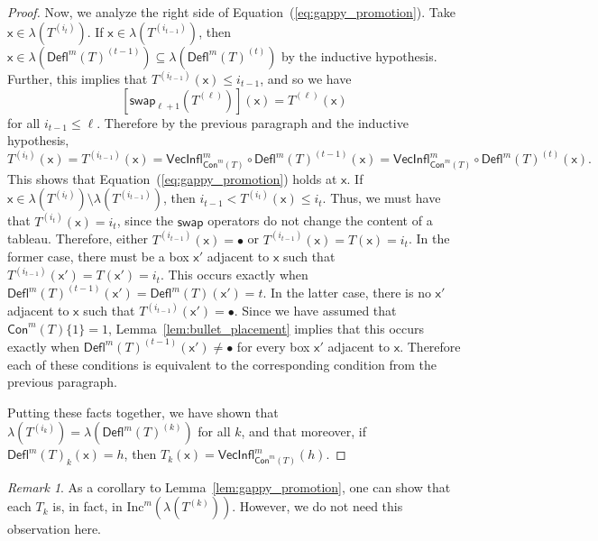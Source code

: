 \documentclass[12pt]{amsart}
\newcommand{\x}{\ensuremath{\mathsf{x}}}
\theoremstyle{definition}
\theoremstyle{remark}
\newtheorem{remark}[theorem]{Remark}
\numberwithin{equation}{section}
\newcommand{\inc}{\ensuremath{\mathrm{Inc}}}
\newcommand{\swap}{\ensuremath{\mathsf{swap}}}
\newcommand{\deflate}{\ensuremath{\mathsf{Defl}}}
\newcommand{\inflate}{\ensuremath{\mathsf{VecInfl}}}
\newcommand{\content}{\ensuremath{\mathsf{Con}}}
\begin{document}
\begin{proof}
Now, we analyze the right side of Equation~(\ref{eq:gappy_promotion}). Take $\x \in \lambda\left( T^{(i_t)} \right)$.   If $\x \in \lambda \left(T^{(i_{t-1})} \right)$, then $\x \in \lambda(\deflate^m(T)^{(t-1)}) \subseteq \lambda(\deflate^m(T)^{(t)})$ by the inductive hypothesis. Further, this implies that $T^{(i_{t-1})}(\x) \leq i_{t-1}$,  and so we have
\[
\left[ \swap_{\ell+1} \left(T^{(\ell)} \right) \right](\x) = T^{(\ell)}(\x)
\]
 for all $i_{t-1} \leq \ell$. Therefore by the previous paragraph and the inductive hypothesis,
 \[ T^{(i_t)}(\x) = T^{(i_{t-1})}(\x) = \inflate^m_{\content^m(T)} \circ \deflate^m(T)^{(t-1)}(\x) =  \inflate^m_{\content^m(T)} \circ \deflate^m(T)^{(t)}(\x). \] This shows that Equation~(\ref{eq:gappy_promotion}) holds at $\x$. If $\x \in \lambda \left(T^{(i_{t})} \right) \setminus \lambda \left(T^{(i_{t-1})} \right)$, then $i_{t-1} < T^{(i_{t})}(\x) \leq i_t$. Thus, we must have that $T^{(i_{t})}(\x) = i_{t}$, since the $\swap$ operators do not change the content of a tableau. Therefore, either $T^{(i_{t-1})}(\x) = \bullet$ or $T^{(i_{t-1})}(\x) =  T(\x) = i_{t}$. In the former case, there must be a box $\x'$ adjacent to $\x$ such that $T^{(i_{t-1})}(\x') = T(\x') = i_{t}$. This occurs exactly when $\deflate^m(T)^{(t-1)}(\x') = \deflate^m(T)(\x') = t$. In the latter case, there is no $\x'$ adjacent to $\x$ such that $T^{(i_{t-1})}(\x') = \bullet$. Since we have assumed that  $\content^m(T) \lbrace 1 \rbrace = 1$, Lemma~\ref{lem:bullet_placement} implies that this occurs exactly when  $\deflate^m(T)^{(t-1)}(\x') \neq \bullet$ for every box $\x'$ adjacent to $\x$. Therefore each of these conditions is equivalent to the corresponding condition from the previous paragraph. 
 
Putting these facts together, we have shown that $\lambda \left(T^{(i_k)} \right) = \lambda \left(\deflate^m(T)^{(k)} \right)$ for all $k$, and that moreover, if $\deflate^m(T)_{k}(\x) = h$, then $T_k(\x) = \inflate^m_{\content^m(T)}(h)$. 
\end{proof}

\begin{remark}
As a corollary to Lemma~\ref{lem:gappy_promotion}, one can show that each $T_k$ is, in fact, in $\inc^m \left(\lambda \left( T^{(k)} \right) \right)$. However, we do not need this observation here.
\end{remark}
\end{document}
